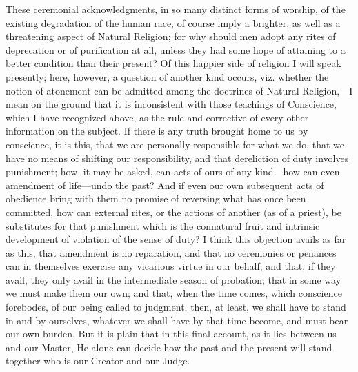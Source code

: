 These ceremonial acknowledgments, in so many distinct forms of
worship, of the existing degradation of the human race, of course
imply a brighter, as well as a threatening aspect of Natural
Religion; for why should men adopt any rites of deprecation or of
purification at all, unless they had some hope of attaining to a
better condition than their present? Of this happier side of religion
I will speak presently; here, however, a question of another kind
occurs, viz. whether the notion of atonement can be admitted among the
doctrines of Natural Religion,—I mean on the ground that it is
inconsistent with those teachings of Conscience, which I have
recognized above, as the rule and corrective of every other
information on the subject. If there is any truth brought home to us
by conscience, it is this, that we are personally responsible for what
we do, that we have no means of shifting our responsibility, and that
dereliction of duty involves punishment; how, it may be asked, can
acts of ours of any kind—how can even amendment of life—undo the
past? And if even our own subsequent acts of obedience bring with them
no promise of reversing what has once been committed, how can external
rites, or the actions of another (as of a priest), be substitutes for
that punishment which is the connatural fruit and intrinsic
development of violation of the sense of duty? I think this objection
avails as far as this, that amendment is no reparation, and that no
ceremonies or penances can in themselves exercise any vicarious virtue
in our behalf; and that, if they avail, they only avail in the
intermediate season of probation; that in some way we must make them
our own; and that, when the time comes, which conscience forebodes, of
our being called to judgment, then, at least, we shall have to stand
in and by ourselves, whatever we shall have by that time become,
and must bear our own burden. But it is plain that in this final
account, as it lies between us and our Master, He alone can decide how
the past and the present will stand together who is our Creator and
our Judge.

